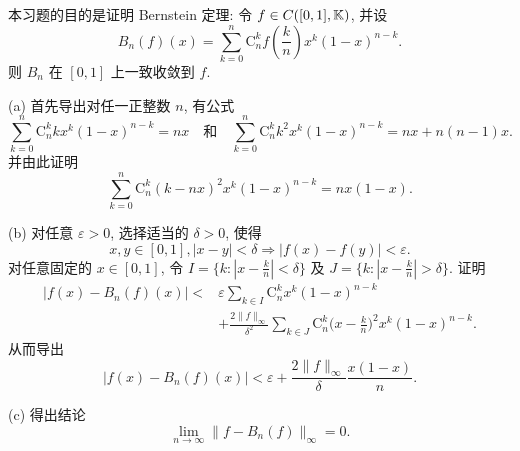 \begin{exercise}[14]
    本习题的目的是证明 Bernstein 定理: 令 $f\in C([0,1], \mathbb{K})$, 并设
    \[
    B_{n}(f)(x)=\sum_{k=0}^{n} \mathrm{C}_{n}^{k} f\left(\frac{k}{n}\right) x^{k}(1-x)^{n-k}.
    \]
    则 $B_{n}$ 在 $[0,1]$ 上一致收敛到 $f$.

    (a) 首先导出对任一正整数 $n$, 有公式
    \[
    \sum_{k=0}^{n} \mathrm{C}_{n}^{k} k x^{k}(1-x)^{n-k}=nx \quad\text{和}\quad\sum_{k=0}^{n} \mathrm{C}_{n}^{k} k^2 x^k(1-x)^{n-k}=nx+n(n-1)x.
    \]
    并由此证明
    \[
    \sum_{k=0}^{n} \mathrm{C}_{n}^{k}(k-nx)^2 x^k (1-x)^{n-k}=nx(1-x).
    \]

    (b) 对任意 $\varepsilon>0$, 选择适当的 $\delta>0$, 使得
    \[
    x, y \in[0,1],|x-y|<\delta \Rightarrow|f(x)-f(y)|<\varepsilon.
    \]
    对任意固定的 $x\in [0,1]$, 令 $I=\{k:|x-\frac{k}{n}|<\delta\}$
    及 $J=\{k:|x-\frac{k}{n}|>\delta\}$. 证明
    \begin{align*}
        |f(x)-B_n(f)(x)|<{}
        & \varepsilon\sum_{k\in I}\mathrm{C}_n^k x^k(1-x)^{n-k} \\
        & +\frac{2\|f\|_{\infty}}{\delta^2}\sum_{k\in J}\mathrm{C}_n^k \biggl(x-\frac{k}{n}\biggr)^2x^k(1-x)^{n-k}.
    \end{align*}
    从而导出
    \[|f(x)-B_n(f)(x)|<\varepsilon+\frac{2\|f\|_{\infty}}{\delta}\frac{x(1-x)}{n}.\]

    (c) 得出结论
    \[\lim_{n\to\infty}\|f-B_n(f)\|_{\infty}=0.\]
\end{exercise}

